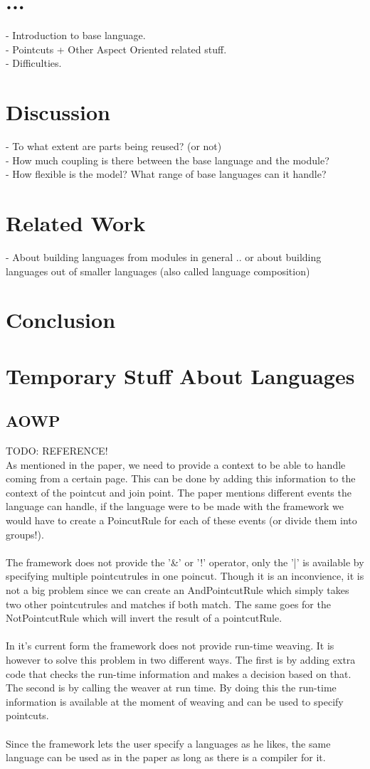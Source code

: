 \documentclass[a4paper]{report}
\begin{document}
\chapter{...}
- Introduction to base language.\\
- Pointcuts + Other Aspect Oriented related stuff.\\
- Difficulties.
\chapter{Discussion}
- To what extent are parts being reused? (or not)\\
- How much coupling is there between the base language and the module?\\
- How flexible is the model? What range of base languages can it handle?
\chapter{Related Work}
- About building languages from modules in general .. or about building languages out of smaller languages (also called language composition)
\chapter{Conclusion}

\chapter{Temporary Stuff About Languages}
\section{AOWP}
TODO: REFERENCE!\\
As mentioned in the paper, we need to provide a context to be able to handle coming from a certain page. This can be done by adding this information to the context of the pointcut and join point. The paper mentions different events the language can handle, if the language were to be made with the framework we would have to create a PoincutRule for each of these events (or divide them into groups!).\\
\\
The framework does not provide the '\&' or '!' operator, only the '|' is available by specifying multiple pointcutrules in one poincut. Though it is an inconvience, it is not a big problem since we can create an AndPointcutRule which simply takes two other pointcutrules and matches if both match. The same goes for the NotPointcutRule which will invert the result of a pointcutRule.\\
\\
In it's current form the framework does not provide run-time weaving. It is however to solve this problem in two different ways. The first is by adding extra code that checks the run-time information and makes a decision based on that. The second is by calling the weaver at run time.  By doing this the run-time information is available at the moment of weaving and can be used to specify pointcuts.\\
\\
Since the framework lets the user specify a languages as he likes, the same language can be used as in the paper as long as there is a compiler for it.
\end{document}
